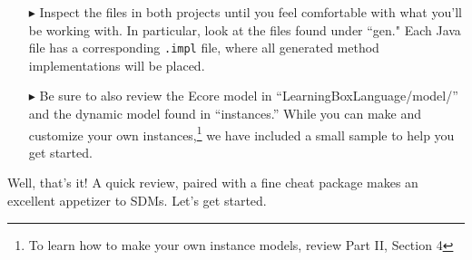 \begin{itemize}
	
\itemWithRightTriangle In order to start working with the cheat package, you have to generate code by (i) opening the \texttt{.eap} file in \texttt{LeitnersLearningBoxVisual}, (ii) exporting it using Enterprise Architect, (iii) refreshing the project containing the \texttt{.eap} and (iv) rebuilding the  \texttt{LearningBoxLanguage} project. For more details on the code generation process, refer to Part I, Section 2.

\item[$\blacktriangleright$] Inspect the files in both projects until you feel comfortable with what you'll be working with. In particular, look at the files
found under ``gen." Each Java file has a corresponding \texttt{.impl} file, where all generated method implementations will be placed.

\item[$\blacktriangleright$] Be sure to also review the Ecore model in ``LearningBoxLanguage/model/'' and the dynamic model found in ``instances.'' While
you can make and customize your own instances,\footnote{To learn how to make your own instance models, review Part II, Section 4} we have included a small
sample to help you get started.

\end{itemize}

Well, that's it! A quick review, paired with a fine cheat package makes an excellent appetizer to SDMs. Let's get started.